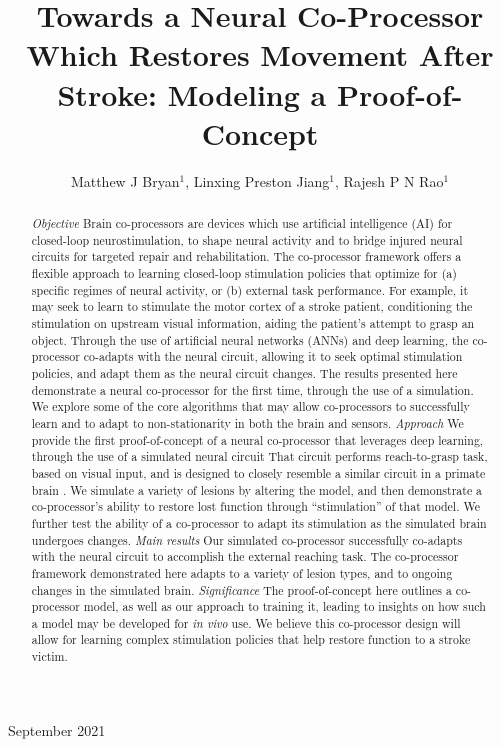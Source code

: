 \documentclass[12pt]{iopart}
\begin{document}
\title[Modeling a Neural Co-Processor]
{Towards a Neural Co-Processor Which Restores Movement After Stroke: Modeling a Proof-of-Concept}

\author{Matthew J Bryan$^{1}$, Linxing Preston Jiang$^{1}$, Rajesh P N Rao$^{1}$}

\address{$^{1}$ Neural Systems Laboratory, Department of Computer
Science and Engineering, University of Washington, Box 352350,
Seattle, WA 98105, USA}

\vspace{10pt}
\begin{indented}
\item[]September 2021
\end{indented}

\begin{abstract}
\textit{Objective} Brain co-processors\cite{rao.coproc} are devices which use artificial
intelligence (AI) for closed-loop neurostimulation, to shape neural activity and to bridge
injured neural circuits for targeted repair and rehabilitation. The co-processor framework
offers a flexible approach to learning closed-loop stimulation policies that optimize for
(a) specific regimes of neural activity, or (b) external task performance.
For example, it may seek to learn to stimulate the motor cortex of a stroke patient,
conditioning the stimulation on upstream visual information, aiding the patient's
attempt to grasp an object. Through the use of artificial neural
networks (ANNs) and deep learning, the co-processor co-adapts with the
neural circuit, allowing it to seek optimal stimulation policies, and adapt them
as the neural circuit changes. The results presented here demonstrate a
neural co-processor for the first time, through the use of a simulation. We
explore some of the core algorithms that may allow co-processors to successfully
learn and to adapt to non-stationarity in both the brain and sensors.
\textit{Approach} We provide the first proof-of-concept of a neural co-processor that
leverages deep learning, through the use of a simulated neural circuit
That circuit performs reach-to-grasp task, based on visual input, and is designed to
closely resemble a similar circuit in a primate brain \cite{michaels.mrnn}. We simulate
a variety of lesions by altering the model, and then demonstrate a co-processor's ability
to restore lost function through ``stimulation'' of that model. We further test the
ability of a co-processor to adapt its stimulation as the simulated brain undergoes changes.
\textit{Main results} Our simulated co-processor successfully co-adapts with the neural
circuit to accomplish the external reaching task. The co-processor framework
demonstrated here adapts to a variety of lesion types, and to ongoing changes in the
simulated brain.
\textit{Significance} The proof-of-concept here outlines a co-processor model, as well
as our approach to training it, leading to insights on how such a model may be
developed for \textit{in vivo} use. We believe this co-processor design will allow for
learning complex stimulation policies that help restore function to a stroke victim.
\end{abstract}
\end{document}
